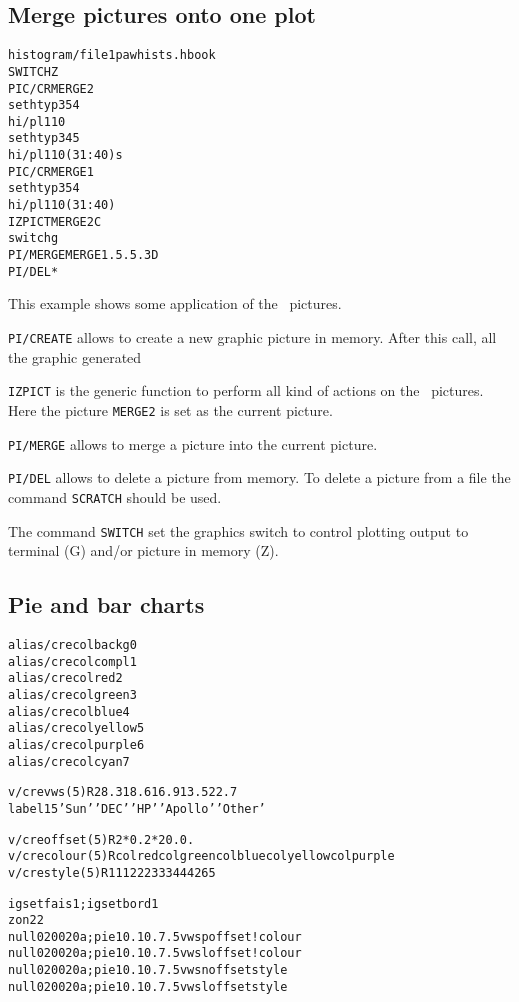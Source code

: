 \subsection{Merge pictures onto one plot}
\begin{alltt}
      histogram/file 1 pawhists.hbook
     SWITCH Z
     PIC/CR MERGE2
      set htyp 354
      hi/pl 110
      set htyp 345
      hi/pl 110(31:40) s
     PIC/CR MERGE1
      set htyp 354
      hi/pl 110(31:40)
     IZPICT MERGE2 C
      switch g
     PI/MERGE MERGE1 .5 .5 .3 D
     PI/DEL *
\end{alltt} 
This example shows some application of the \HIGZ\ pictures.
\begin{DinglistE}
\item {\tt PI/CREATE} allows to create a new graphic picture in memory.
      After this call, all the graphic generated
\item {\tt IZPICT} is the generic function to perform all kind of
      actions on the \HIGZ\ pictures. Here the picture {\tt MERGE2} is set as
      the current picture.
\item {\tt PI/MERGE} allows to merge a picture into the current picture.
\item {\tt PI/DEL} allows to delete a picture from memory. To
      delete a picture from a file the command {\tt SCRATCH}
      should be used.
\item The command {\tt SWITCH} set the graphics switch to control plotting
      output to terminal (G) and/or picture in memory (Z).
\end{DinglistE}

\clearpage

\subsection{Pie and bar charts}

\begin{alltt}
      alias/cre colbackg  0
      alias/cre colcompl  1
      alias/cre colred    2
      alias/cre colgreen  3
      alias/cre colblue   4
      alias/cre colyellow 5
      alias/cre colpurple 6
      alias/cre colcyan   7

      v/cre vws(5) R 28.3 18.6 16.9 13.5 22.7
      label 1 5 'Sun' 'DEC' 'HP' 'Apollo' 'Other'

      v/cre offset(5)  R 2*0. 2*20. 0.
      v/cre colour(5)  R colred colgreen colblue colyellow colpurple
      v/cre style(5)   R 111 222 333 444 265

      igset fais 1 ; igset bord 1
      zon 2 2
      null 0 20 0 20 a ; pie 10. 10. 7.  5 vws p offset ! colour
      null 0 20 0 20 a ; pie 10. 10. 7.  5 vws l offset ! colour
      null 0 20 0 20 a ; pie 10. 10. 7.  5 vws n offset style
      null 0 20 0 20 a ; pie 10. 10. 7.  5 vws l offset style
\end{alltt} 

